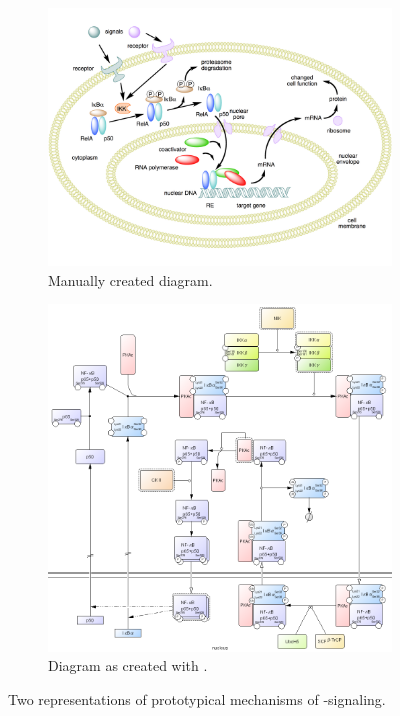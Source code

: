 \documentclass[
	fontsize=10pt, %
	twoside=false, %
	secnumdepth=1, %
  toc=indentunnumbered %
]{kaobook}
\begin{document}
\begin{figure}[h]
  \centering
  \begin{subfigure}{0.4\textwidth}
    \centering
    \includegraphics[width=\textwidth]{NF-kB-mechanism/handdrawn.png}
    \caption{Manually created diagram.}
    \label{fig:process-diagram-old-vs-new:handdrawn}
  \end{subfigure}
  \hspace{1em}
  \begin{subfigure}{0.4\textwidth}
    \centering
    \includegraphics[width=\textwidth]{NF-kB-mechanism/CellDesigner.png}
    \caption{Diagram as created with \celldesigner.}
    \label{fig:process-diagram-old-vs-new:celldesigner}
  \end{subfigure}
  \caption{
    Two representations of prototypical mechanisms of \nfkb-signaling.
  }
  \label{fig:process-diagram-old-vs-new}
\end{figure}
\end{document}
